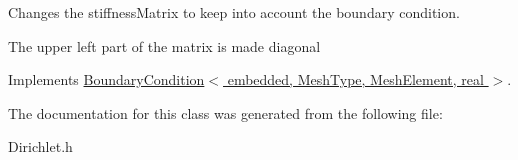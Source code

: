 \-Changes the stiffness\-Matrix to keep into account the boundary condition. 

\-The upper left part of the matrix is made diagonal 

\-Implements \hyperlink{class_boundary_condition_a19b5c27271977f40146d867ff281ad24}{\-Boundary\-Condition$<$ embedded, Mesh\-Type, Mesh\-Element, real $>$}.



\-The documentation for this class was generated from the following file\-:\begin{DoxyCompactItemize}
\item 
\-Dirichlet.\-h\end{DoxyCompactItemize}
